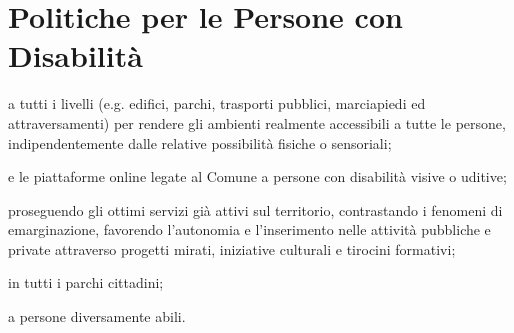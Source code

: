 \section{Politiche per le Persone con Disabilità}
 a tutti i livelli (e.g. edifici, parchi, trasporti pubblici, marciapiedi ed attraversamenti) per rendere gli ambienti realmente accessibili a tutte le persone, indipendentemente dalle relative possibilità fisiche o sensoriali;

 e le piattaforme online legate al Comune a persone con disabilità visive o uditive;

 proseguendo gli ottimi servizi già attivi sul territorio, contrastando i fenomeni di emarginazione, favorendo l'autonomia e l'inserimento nelle attività pubbliche e private attraverso progetti mirati, iniziative culturali e tirocini formativi;

 in tutti i parchi cittadini;

 a persone diversamente abili.
